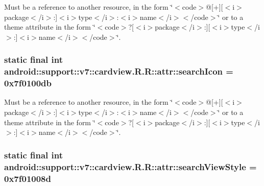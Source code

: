 Must be a reference to another resource, in the form \char`\"{}$<$code$>$@\mbox{[}+\mbox{]}\mbox{[}$<$i$>$package$<$/i$>$:\mbox{]}$<$i$>$type$<$/i$>$:$<$i$>$name$<$/i$>$$<$/code$>$\char`\"{} or to a theme attribute in the form \char`\"{}$<$code$>$?\mbox{[}$<$i$>$package$<$/i$>$:\mbox{]}\mbox{[}$<$i$>$type$<$/i$>$:\mbox{]}$<$i$>$name$<$/i$>$$<$/code$>$\char`\"{}. \hypertarget{classandroid_1_1support_1_1v7_1_1cardview_1_1_r_1_1attr_47937f253d4d20520b3cfa867694dd67}{
\subsubsection[{searchIcon}]{\setlength{\rightskip}{0pt plus 5cm}static final int android::support::v7::cardview.R.R::attr::searchIcon = 0x7f0100db}}
\label{classandroid_1_1support_1_1v7_1_1cardview_1_1_r_1_1attr_47937f253d4d20520b3cfa867694dd67}


Must be a reference to another resource, in the form \char`\"{}$<$code$>$@\mbox{[}+\mbox{]}\mbox{[}$<$i$>$package$<$/i$>$:\mbox{]}$<$i$>$type$<$/i$>$:$<$i$>$name$<$/i$>$$<$/code$>$\char`\"{} or to a theme attribute in the form \char`\"{}$<$code$>$?\mbox{[}$<$i$>$package$<$/i$>$:\mbox{]}\mbox{[}$<$i$>$type$<$/i$>$:\mbox{]}$<$i$>$name$<$/i$>$$<$/code$>$\char`\"{}. \hypertarget{classandroid_1_1support_1_1v7_1_1cardview_1_1_r_1_1attr_3bf1a5a39c7271a27becd94b9dfe4656}{
\subsubsection[{searchViewStyle}]{\setlength{\rightskip}{0pt plus 5cm}static final int android::support::v7::cardview.R.R::attr::searchViewStyle = 0x7f01008d}}
\label{classandroid_1_1support_1_1v7_1_1cardview_1_1_r_1_1attr_3bf1a5a39c7271a27becd94b9dfe4656}


